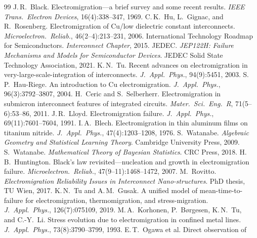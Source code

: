 \documentclass{article}
\begin{document}
\begin{thebibliography}{99}
\small
{} J.\,R.~Black. Electromigration---a brief survey
and some recent results. \textit{IEEE Trans.\ Electron Devices}, 16(4):338--347,
1969.
 C.\,K.~Hu, L.~Gignac, and R.~Rosenberg.
Electromigration of Cu/low dielectric constant interconnects.
\textit{Microelectron.\ Reliab.}, 46(2--4):213--231, 2006.
 International Technology Roadmap for Semiconductors.
\textit{Interconnect Chapter}, 2015.
 JEDEC. \textit{JEP122H: Failure Mechanisms and
Models for Semiconductor Devices}. JEDEC Solid State Technology Association,
2021.
 K.\,N.~Tu. Recent advances on electromigration in
very-large-scale-integration of interconnects. \textit{J.\ Appl.\ Phys.},
94(9):5451, 2003.
 S.\,P.~Hau-Riege. An introduction to Cu
electromigration. \textit{J.\ Appl.\ Phys.}, 96(3):3792--3807, 2004.
 H.~Ceric and S.~Selberherr.
Electromigration in submicron interconnect features of integrated circuits.
\textit{Mater.\ Sci.\ Eng.\ R}, 71(5--6):53--86, 2011.
 J.\,R.~Lloyd. Electromigration failure.
\textit{J.\ Appl.\ Phys.}, 69(11):7601--7604, 1991.
 I.\,A.~Blech. Electromigration in thin aluminum
films on titanium nitride. \textit{J.\ Appl.\ Phys.}, 47(4):1203--1208, 1976.
 S.~Watanabe. \textit{Algebraic Geometry
and Statistical Learning Theory}. Cambridge University Press, 2009.
 S.~Watanabe. \textit{Mathematical Theory
of Bayesian Statistics}. CRC Press, 2018.
 H.\,B.~Huntington. Black's law
revisited---nucleation and growth in electromigration failure.
\textit{Microelectron.\ Reliab.}, 47(9--11):1468--1472, 2007.
 M.~Rovitto. \textit{Electromigration
Reliability Issues in Interconnect Nano-structures}. PhD thesis, TU Wien, 2017.
 K.\,N.~Tu and A.\,M.~Gusak. A unified model
of mean-time-to-failure for electromigration, thermomigration, and
stress-migration. \textit{J.\ Appl.\ Phys.}, 126(7):075109, 2019.
 M.\,A.~Korhonen, P.~B{\o}rgesen,
K.\,N.~Tu, and C.-Y.~Li. Stress evolution due to electromigration in confined
metal lines. \textit{J.\ Appl.\ Phys.}, 73(8):3790--3799, 1993.
 E.\,T.~Ogawa et al. Direct observation of

\end{thebibliography}
\end{document}
